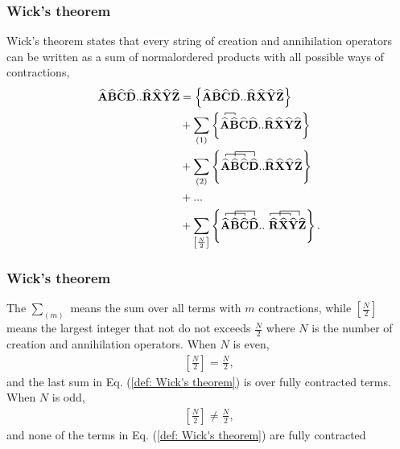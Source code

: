 \documentclass{beamer}
\newcommand*{\kpr}[1]{\left\{#1\right\}}
\newcommand{\OP}[1]{{\bf\widehat{#1}}}
\newcommand*{\fpr}[1]{\left[#1\right]}
\newcommand*{\pr}[1]{\left(#1\right)}
\begin{document}
\frame
{
  \frametitle{Wick's theorem}
\begin{small}
{\scriptsize
Wick's theorem states that every string of creation and annihilation operators can be written as a sum of normalordered products with all possible ways of contractions,
\begin{align}
\label{def: Wick's theorem}
\OP{A}\OP{B}\OP{C}\OP{D}..\OP{R}\OP{X}\OP{Y}\OP{Z} &= \kpr{\OP{A}\OP{B}\OP{C}\OP{D}..\OP{R}\OP{X}\OP{Y}\OP{Z}}\\
&+ \sum_{\pr{1}} \kpr{ 
\contraction[0.5ex]{}{\OP{A}}{}{\OP{B}} \OP{A}\OP{B}\OP{C}\OP{D}..\OP{R}\OP{X}\OP{Y}\OP{Z}}\\
&+ \sum_{\pr{2}} \kpr{\contraction[0.5ex]{}{\OP{A}}{\OP{B}}{\OP{C}}\contraction[1.0ex]{\OP{A}}{\OP{B}}{\OP{C}}{\OP{D}}\OP{A}\OP{B}\OP{C}\OP{D}..\OP{R}\OP{X}\OP{Y}\OP{Z}}\\
&+ ...\\
&+ \sum_{\fpr{\frac{N}{2}}}\kpr{\contraction[0.5ex]{}{\OP{A}}{\OP{B}}{\OP{C}}\contraction[1.0ex]{\OP{A}}{\OP{B}}{\OP{C}}{\OP{D}} \OP{A}\OP{B}\OP{C}\OP{D}..\contraction[0.5ex]{}{\OP{R}}{\OP{X}}{\OP{Y}}\contraction[1.0ex]{\OP{R}}{\OP{X}}{\OP{Y}}{\OP{Z}}\ \OP{R}\OP{X}\OP{Y}\OP{Z}}.
\end{align}
}
\end{small}
}

\frame
{
  \frametitle{Wick's theorem}
\begin{small}
{\scriptsize
The $\sum_{\pr{m}}$ means the sum over all terms with $m$ contractions, while $\fpr{\frac{N}{2}}$ means the largest integer that not do not exceeds $\frac{N}{2}$ where $N$ is the number of creation and annihilation operators. When $N$ is even, 
\begin{align}
\label{exp: Wick condition}
\fpr{\frac{N}{2}} = \frac{N}{2},
\end{align}
and the last sum in Eq. (\ref{def: Wick's theorem}) is over fully contracted terms. When $N$ is odd,
\begin{align}
\fpr{\frac{N}{2}} \neq \frac{N}{2},
\end{align}
and none of the terms in Eq. (\ref{def: Wick's theorem}) are fully contracted 
}
\end{small}
}
\end{document}
